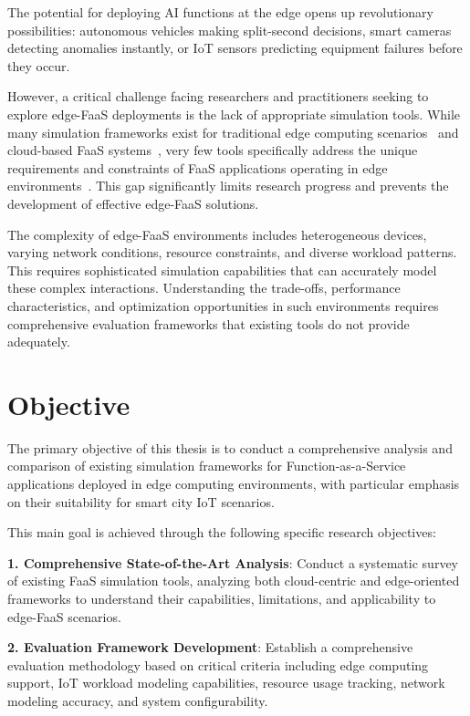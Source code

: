 The potential for deploying AI functions at the edge opens up revolutionary possibilities: autonomous vehicles making split-second decisions, smart cameras detecting anomalies instantly, or IoT sensors predicting equipment failures before they occur.

However, a critical challenge facing researchers and practitioners seeking to explore edge-FaaS deployments is the lack of appropriate simulation tools. While many simulation frameworks exist for traditional edge computing scenarios~\cite{svorobej2019simulating} and cloud-based FaaS systems~\cite{mahmoudi2021simfaas}, very few tools specifically address the unique requirements and constraints of FaaS applications operating in edge environments~\cite{jeon2019cloudsim}. This gap significantly limits research progress and prevents the development of effective edge-FaaS solutions.

The complexity of edge-FaaS environments includes heterogeneous devices, varying network conditions, resource constraints, and diverse workload patterns. This requires sophisticated simulation capabilities that can accurately model these complex interactions. Understanding the trade-offs, performance characteristics, and optimization opportunities in such environments requires comprehensive evaluation frameworks that existing tools do not provide adequately.

\section{Objective}

The primary objective of this thesis is to conduct a comprehensive analysis and comparison of existing simulation frameworks for Function-as-a-Service applications deployed in edge computing environments, with particular emphasis on their suitability for smart city IoT scenarios.

This main goal is achieved through the following specific research objectives:

\textbf{1. Comprehensive State-of-the-Art Analysis}: Conduct a systematic survey of existing FaaS simulation tools, analyzing both cloud-centric and edge-oriented frameworks to understand their capabilities, limitations, and applicability to edge-FaaS scenarios.

\textbf{2. Evaluation Framework Development}: Establish a comprehensive evaluation methodology based on critical criteria including edge computing support, IoT workload modeling capabilities, resource usage tracking, network modeling accuracy, and system configurability.

